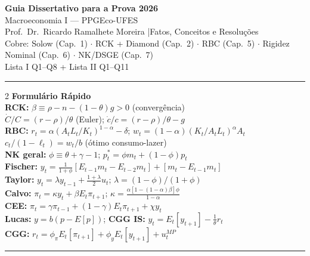 \documentclass[12pt, a4paper]{article}
\begin{document}

\begin{center}
{\LARGE\bfseries\color{azul} Guia Dissertativo para a Prova 2026}\\[4pt]
{\large Macroeconomia I --- PPGEco-UFES}\\[2pt]
{\normalsize Prof.\ Dr.\ Ricardo Ramalhete Moreira \quad|\quad Fatos, Conceitos e Resoluções}\\[4pt]
{\small\color{cinza} Cobre: Solow (Cap.\ 1) $\cdot$ RCK + Diamond (Cap.\ 2) $\cdot$ RBC (Cap.\ 5)
$\cdot$ Rigidez Nominal (Cap.\ 6) $\cdot$ NK/DSGE (Cap.\ 7)\\
Lista I Q1--Q8 + Lista II Q1--Q11}
\end{center}

\vspace{0.3cm}\hrule\vspace{0.5cm}

{\small
\begin{multicols}{2}
\textbf{Formulário Rápido}\\[2pt]
\textbf{RCK:} $\beta \equiv \rho - n - (1-\theta)g > 0$ (convergência)\\
$\dot{C}/C = (r-\rho)/\theta$ (Euler); $\dot{c}/c = (r-\rho)/\theta - g$\\[2pt]
\textbf{RBC:} $r_t = \alpha(A_tL_t/K_t)^{1-\alpha}-\delta$; $w_t = (1-\alpha)(K_t/A_tL_t)^\alpha A_t$\\
$c_t/(1-\ell_t) = w_t/b$ (ótimo consumo-lazer)\\[2pt]
\textbf{NK geral:} $\phi \equiv \theta + \gamma - 1$; $p_t^* = \phi m_t + (1-\phi)p_t$\\
\textbf{Fischer:} $y_t = \tfrac{1}{1+\phi}[E_{t-1}m_t - E_{t-2}m_t] + [m_t - E_{t-1}m_t]$\\
\textbf{Taylor:} $y_t = \lambda y_{t-1} + \tfrac{1+\lambda}{2}u_t$; $\lambda=(1-\phi)/(1+\phi)$\\
\textbf{Calvo:} $\pi_t = \kappa y_t + \beta E_t\pi_{t+1}$; $\kappa = \tfrac{\alpha[1-(1-\alpha)\beta]\phi}{1-\alpha}$\\
\textbf{CEE:} $\pi_t = \gamma\pi_{t-1} + (1-\gamma)E_t\pi_{t+1} + \chi y_t$\\
\textbf{Lucas:} $y = b(p - E[p])$; \textbf{CGG IS:} $y_t = E_t[y_{t+1}] - \tfrac{1}{\theta}r_t$\\
\textbf{CGG:} $r_t = \phi_\pi E_t[\pi_{t+1}] + \phi_y E_t[y_{t+1}] + u_t^{MP}$
\end{multicols}
}
\vspace{0.3cm}\hrule\vspace{0.5cm}
\end{document}
